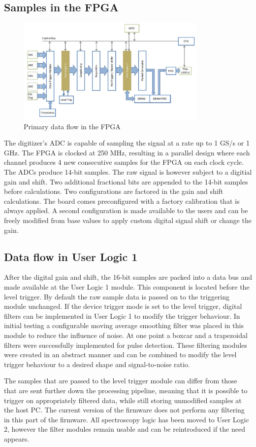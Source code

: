 \documentclass[12pt]{article}
\begin{document}
	\subsection{Samples in the FPGA}
		\begin{figure}[!h]
			\centering
			\includegraphics[width=0.83\textwidth]{img/devkit_dataflow.png}
			\caption{Primary data flow in the FPGA}\label{fig:devkit_dataflow}
		\end{figure}
		The digitizer's ADC is capable of sampling the signal at a rate up to 1 GS/s or 1 GHz.
		The FPGA is clocked at 250 MHz, resulting in a parallel design where each channel produces
		4 new consecutive samples for the FPGA on each clock cycle. The ADCs produce 14-bit samples.
		The raw signal is however subject to a digitial gain and shift.
		Two additional fractional bits are appended to the 14-bit samples before calculations.
		Two configurations are factored in the gain and shift calculations. 
		The board comes preconfigured with a factory calibration that is always applied. 
		A second configuration is made available to
		the users and can be freely modified from base values 
		to apply custom digital signal shift or change the gain.
	\subsection{Data flow in User Logic 1}
		After the digital gain and shift, the 16-bit samples are packed into a data bus 
		and made available at the User Logic 1 module. 
		This component is located before the level trigger. 
		By default the raw sample data is passed on to the triggering module unchanged. 
		If the device trigger mode is set to the level trigger,
		digital filters can be implemented in User Logic 1 to modify the trigger behaviour. 
		In initial testing a configurable moving average smoothing filter was placed in this module 
		to reduce the influence of noise.
		At one point a boxcar and a trapezoidal filters were successfully implemented for pulse detection.
		These filtering modules were created in an abstract manner 
		and can be combined to modify the level trigger
		behaviour to a desired shape and signal-to-noise ratio.
		\par
		The samples that are passed to the level trigger module can differ from those that are sent further
		down the processing pipeline, meaning that it is possible to trigger on appropriately filtered data,
		while still storing unmodified samples at the host PC. The current version of the firmware does not
		perform any filtering in this part of the firmware. All spectroscopy logic has been moved to User Logic 2,
		however the filter modules remain usable and can be reintroduced if the need appears.
\end{document}
